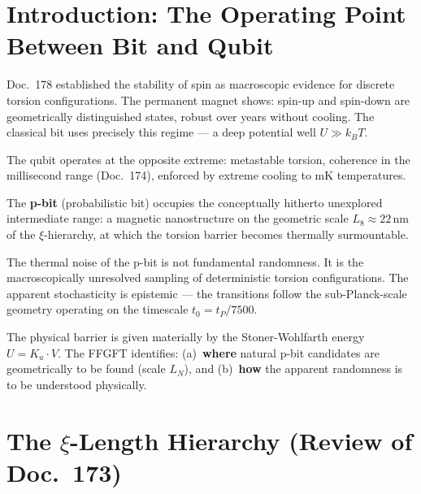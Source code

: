 	\maketitle
	\tableofcontents
	\newpage
	
	\section{Introduction: The Operating Point Between Bit and Qubit}
	\label{sec:introduction}
	
	Doc.~178 established the stability of spin as macroscopic evidence
	for discrete torsion configurations. The permanent magnet shows:
	spin-up and spin-down are geometrically distinguished states, robust over
	years without cooling. The classical bit uses precisely this regime ---
	a deep potential well $U \gg k_B T$.
	
	The qubit operates at the opposite extreme: metastable torsion,
	coherence in the millisecond range (Doc.~174), enforced by
	extreme cooling to mK temperatures.
	
	The \textbf{p-bit} (probabilistic bit) occupies the conceptually
	hitherto unexplored intermediate range: a magnetic nanostructure
	on the geometric scale $L_8 \approx 22\,\text{nm}$ of the
	$\xi$-hierarchy, at which the torsion barrier becomes thermally
	surmountable.
	
	\begin{significance}
		The thermal noise of the p-bit is not fundamental randomness.
		It is the macroscopically unresolved sampling of deterministic
		torsion configurations. The apparent stochasticity is epistemic
		--- the transitions follow the sub-Planck-scale geometry
		operating on the timescale $t_0 = t_P/7500$.
		
		The physical barrier is given materially by the
		Stoner-Wohlfarth energy $U = K_u \cdot V$.
		The FFGFT identifies: (a)~\textbf{where} natural p-bit candidates
		are geometrically to be found (scale $L_N$), and (b)~\textbf{how} the
		apparent randomness is to be understood physically.
	\end{significance}
	
	\section{The \texorpdfstring{$\xi$}{xi}-Length Hierarchy
		(Review of Doc.~173)}
	\label{sec:length-hierarchy}
	
